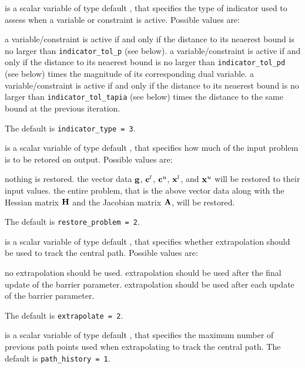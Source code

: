 \begin{description}

 is a scalar variable of type default \integer,
that specifies the type of indicator used to assess when a variable or
constraint is active.
Possible values are:

\begin{description}
 a variable/constraint is active if and only if the distance
to its neaerest bound is no larger than {\tt indicator\_tol\-\_p} (see below).
 a variable/constraint is active if and only if the distance
to its neaerest bound is no larger than {\tt indicator\_tol\-\_pd}
(see below) times the magnitude of its corresponding dual variable.
 a variable/constraint is active if and only if the distance
to its neaerest bound is no larger than {\tt indicator\_tol\-\_tapia}
(see below) times the distance to the same bound at the previous iteration.
\end{description}
The default is {\tt indicator\_type = 3}.

 is a scalar variable of type default \integer, that
specifies how much of the input problem is to be retored on output.
Possible values are:
\begin{description}
 nothing is restored.
 the vector data ${\mathbf{g}}$,
   ${\mathbf{c}}^{l}$, ${\mathbf{c}}^{u}$, ${\mathbf{x}}^{l}$, and ${\mathbf{x}}^{u}$
   will be restored to their input values.
 the entire problem, that is the above vector data along with
the Hessian matrix ${\mathbf{H}}$ and the Jacobian matrix ${\mathbf{A}}$, will be restored.
\end{description}
The default is {\tt restore\_problem = 2}.

 is a scalar variable of type default \integer, that
specifies whether extrapolation should be used to track the central path.
Possible values are:
\begin{description}
 no extrapolation should be used.
 extrapolation should be used after the final update of the barrier
        parameter.
 extrapolation should be used after each update of the barrier
        parameter.
\end{description}
The default is {\tt extrapolate = 2}.

 is a scalar variable of type default \integer, that
specifies the maximum number of previous path points used when extrapolating
to track the central path.
The default is {\tt path\_history = 1}.


\end{description}
